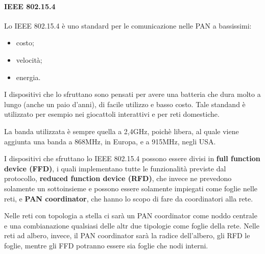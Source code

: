 \paragraph{IEEE 802.15.4}
Lo IEEE 802.15.4 è uno standard per le comunicazione nelle PAN a bassissimi:
\begin{itemize}
  \item costo;
  \item velocità;
  \item energia.
\end{itemize}

I dispositivi che lo sfruttano sono pensati per avere una batteria che dura 
molto a lungo (anche un paio d'anni), di facile utilizzo e basso costo. Tale 
standand è utilizzato per esempio nei giocattoli interattivi e per reti 
domestiche.

La banda utilizzata è sempre quella a 2,4GHz, poichè libera, al quale viene 
aggiunta una banda a 868MHz, in Europa, e a 915MHz, negli USA.

I dispositivi che sfruttano lo IEEE 802.15.4 possono essere divisi in 
\textbf{full function device (FFD)}, i quali implementano tutte le funzionalità 
previste dal protocollo, \textbf{reduced function device (RFD)}, che invece ne 
prevedono solamente un sottoinsieme e possono essere solamente impiegati come 
foglie nelle reti, e \textbf{PAN coordinator}, che hanno lo scopo di fare da 
coordinatori alla rete.

Nelle reti con topologia a stella ci sarà un PAN coordinator come noddo centrale 
e una combianazione qualsiasi delle altr due tipologie come foglie della rete. 
Nelle reti ad albero, invece, il PAN coordinator sarà la radice dell'albero, gli 
RFD le foglie, mentre gli FFD potranno essere sia foglie che nodi interni. 

